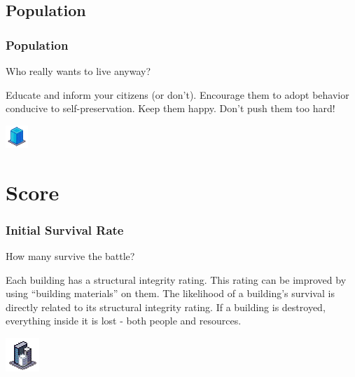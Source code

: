 \documentclass[ascpectratio=169]{beamer}
\begin{document}

\subsection{Population}


\begin{frame}

  \frametitle{Population}

  \begin{center}
    {\large Who really wants to live anyway?}
  \end{center}

  \begin{outline}
    \1 Educate and inform your citizens (or don't).
    \1 Encourage them to adopt behavior conducive to self-preservation.
    \1 Keep them happy.
    \1 Don't push them too hard!
  \end{outline}

  \begin{center}
    \includegraphics[scale=2.0]{../../Images/flats.png}
  \end{center}

\end{frame}


\section{Score}


\begin{frame}

  \frametitle{Initial Survival Rate}

  \begin{center}
    {\large How many survive the battle?}
  \end{center}

  \begin{outline}
    \1 Each building has a structural integrity rating.
    \1 This rating can be improved by using ``building materials'' on them.
    \1 The likelihood of a building's survival is directly related to its
    structural integrity rating.
    \1 If a building is destroyed, everything inside it is lost - both people and
    resources.
  \end{outline}
  
  \begin{center}
    \includegraphics[scale=2.0]{../../Images/Apartments.png}
  \end{center}

\end{frame}
\end{document}
